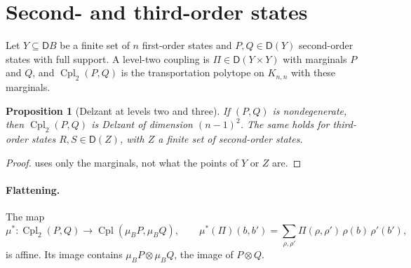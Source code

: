 \documentclass[11pt]{article}
\newtheorem{proposition}[theorem]{Proposition}
\theoremstyle{definition}
\theoremstyle{remark}
\newcommand{\D}{\mathsf{D}}
\newcommand{\Cpl}{\operatorname{Cpl}}
\begin{document}
\section{Second- and third-order states}\label{sec:levels}

Let $Y\subseteq\D B$ be a finite set of $n$ first-order states and $P,Q\in\D(Y)$ second-order states with full
support. A level-two coupling is $\Pi\in\D(Y\times Y)$ with marginals $P$ and $Q$, and $\Cpl_2(P,Q)$ is the
transportation polytope on $K_{n,n}$ with these marginals.

\begin{proposition}[Delzant at levels two and three]\label{prop:l23}
If $(P,Q)$ is nondegenerate, then $\Cpl_2(P,Q)$ is Delzant of dimension $(n-1)^2$. The same holds for
third-order states $R,S\in\D(Z)$, with $Z$ a finite set of second-order states.
\end{proposition}
\begin{proof}
 uses only the marginals, not what the points of $Y$ or $Z$ are.
\end{proof}

\paragraph{Flattening.} The map
\[
\mu^*\colon\Cpl_2(P,Q)\to\Cpl(\mu_BP,\mu_BQ),\qquad
\mu^*(\Pi)(b,b')=\sum_{\rho,\rho'}\Pi(\rho,\rho')\,\rho(b)\,\rho'(b'),
\]
is affine. Its image contains $\mu_BP\otimes\mu_BQ$, the image of $P\otimes Q$.
\end{document}
